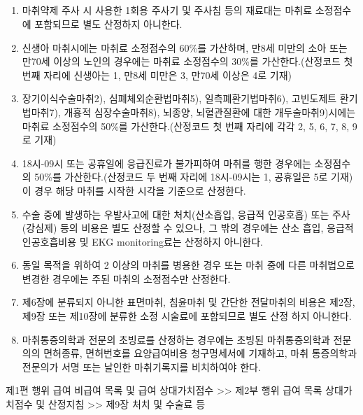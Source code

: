 \subsection{}
\begin{enumerate}[(1)]\tightlist
\item 마취약제 주사 시 사용한 1회용 주사기 및 주사침 등의 재료대는 마취료 소정점수에 포함되므로 별도 산정하지 아니한다.
\item 신생아 마취시에는 마취료 소정점수의 60\%를 가산하며, 만8세 미만의 소아 또는 만70세 이상의 노인의 경우에는 마취료 소정점수의 30\%를 가산한다.(산정코드 첫 번째 자리에 신생아는 1, 만8세 미만은 3, 만70세 이상은 4로 기재)
\item 장기이식수술마취2), 심폐체외순환법마취5), 일측폐환기법마취6), 고빈도제트 환기법마취7), 개흉적 심장수술마취8), 뇌종양, 뇌혈관질환에 대한 개두술마취9)시에는 마취료 소정점수의 50\%를 가산한다.(산정코드 첫 번째 자리에 각각 2, 5, 6, 7, 8, 9로 기재)
\item 18시-09시 또는 공휴일에 응급진료가 불가피하여 마취를 행한 경우에는 소정점수의 50\%를 가산한다.(산정코드 두 번째 자리에 18시-09시는 1, 공휴일은 5로 기재) 이 경우 해당 마취를 시작한 시각을 기준으로 산정한다.
\item 수술 중에 발생하는 우발사고에 대한 처치(산소흡입, 응급적 인공호흡) 또는 주사(강심제) 등의 비용은 별도 산정할 수 있으나, 그 밖의 경우에는 산소 흡입, 응급적 인공호흡비용 및 EKG monitoring료는 산정하지 아니한다.
\item 동일 목적을 위하여 2 이상의 마취를 병용한 경우 또는 마취 중에 다른 마취법으로 변경한 경우에는 주된 마취의 소정점수만 산정한다.
\item 제6장에 분류되지 아니한 표면마취, 침윤마취 및 간단한 전달마취의 비용은 제2장, 제9장 또는 제10장에 분류한 소정 시술료에 포함되므로 별도 산정 하지 아니한다.
\item 마취통증의학과 전문의 초빙료를 산정하는 경우에는 초빙된 마취통증의학과 전문의의 면허종류, 면허번호를 요양급여비용 청구명세서에 기재하고, 마취 통증의학과 전문의가 서명 또는 날인한 마취기록지를 비치하여야 한다.
\end{enumerate}
  
\begin{mdframed}[linecolor=blue,middlelinewidth=2]  
제1편 행위 급여 \cntrdot{}  비급여 목록 및 급여 상대가치점수 >> 제2부 행위 급여 목록\cntrdot{} 상대가치점수 및 산정지침 >> 제9장 처치 및 수술료 등 
\end{mdframed}
\subsection{}
